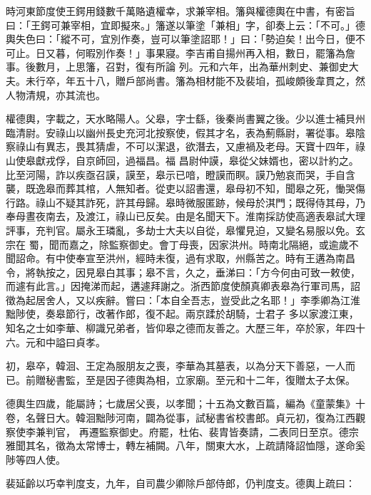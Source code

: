 \begin{pinyinscope}
 時河東節度使王鍔用錢數千萬賂遺權幸，求兼宰相。籓與權德輿在中書，有密旨曰：「王鍔可兼宰相，宜即擬來。」籓遂以筆塗「兼相」字，卻奏上云：「不可。」德輿失色曰：「縱不可，宜別作奏，豈可以筆塗詔耶！」曰：「勢迫矣！出今日，便不可止。日又暮，何暇別作奏！」事果寢。李吉甫自揚州再入相，數日，罷籓為詹事。後數月，上思籓，召對，復有所論
 列。元和六年，出為華州刺史、兼御史大夫。未行卒，年五十八，贈戶部尚書。籓為相材能不及裴垍，孤峻頗後韋貫之，然人物清規，亦其流也。



 權德輿，字載之，天水略陽人。父皋，字士繇，後秦尚書翼之後。少以進士補貝州臨清尉。安祿山以幽州長史充河北按察使，假其才名，表為薊縣尉，署從事。皋陰察祿山有異志，畏其猜虐，不可以潔退，欲潛去，又慮禍及老母。天寶十四年，祿山使皋獻戎俘，自京師回，過福昌。福
 昌尉仲謨，皋從父妹婿也，密以計約之。比至河陽，詐以疾亟召謨，謨至，皋示已喑，瞪謨而瞑。謨乃勉哀而哭，手自含襲，既逸皋而葬其棺，人無知者。從吏以詔書還，皋母初不知，聞皋之死，慟哭傷行路。祿山不疑其詐死，許其母歸。皋時微服匿跡，候母於淇門；既得侍其母，乃奉母晝夜南去，及渡江，祿山已反矣。由是名聞天下。淮南採訪使高適表皋試大理評事，充判官。屬永王璘亂，多劫士大夫以自從，皋懼見迫，又變名易服以免。玄宗在
 蜀，聞而嘉之，除監察御史。會丁母喪，因家洪州。時南北隔絕，或逾歲不聞詔命。有中使奉宣至洪州，經時未復，過有求取，州縣苦之。時有王遘為南昌令，將執按之，因見皋白其事；皋不言，久之，垂涕曰：「方今何由可致一敕使，而遽有此言。」因掩涕而起，遘遽拜謝之。浙西節度使顏真卿表皋為行軍司馬，詔徵為起居舍人，又以疾辭。嘗曰：「本自全吾志，豈受此之名耶！」李季卿為江淮黜陟使，奏皋節行，改著作郎，復不起。兩京蹂於胡騎，士君子
 多以家渡江東，知名之士如李華、柳識兄弟者，皆仰皋之德而友善之。大歷三年，卒於家，年四十六。元和中謚曰貞孝。



 初，皋卒，韓洄、王定為服朋友之喪，李華為其墓表，以為分天下善惡，一人而已。前贈秘書監，至是因子德輿為相，立家廟。至元和十二年，復贈太子太保。



 德輿生四歲，能屬詩；七歲居父喪，以孝聞；十五為文數百篇，編為《童蒙集》十卷，名聲日大。韓洄黜陟河南，闢為從事，試秘書省校書郎。貞元初，復為江西觀察使李兼判官，
 再遷監察御史。府罷，杜佑、裴胄皆奏請，二表同日至京。德宗雅聞其名，徵為太常博士，轉左補闕。八年，關東大水，上疏請降詔恤隱，遂命奚陟等四人使。



 裴延齡以巧幸判度支，九年，自司農少卿除戶部侍郎，仍判度支。德輿上疏曰：




\end{pinyinscope}
